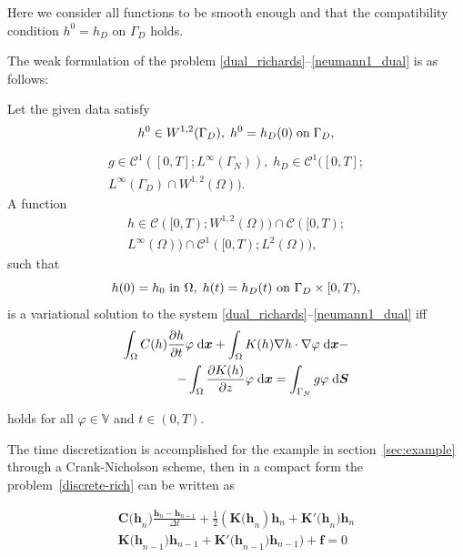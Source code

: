 \documentclass[final,3p,times,twocolumn]{elsarticle}
\newcommand{\bfx}{\mbox{\boldmath $x$}}
\newcommand{\bfS}{\mbox{\boldmath $S$}}
\begin{document}
Here we consider all functions to be smooth enough and that the
compatibility condition $h^0=h_D$ on $\Gamma_D$ holds.


The weak formulation of the problem
\eqref{dual_richards}--\eqref{neumann1_dual} is as follows:

Let the given data satisfy
\begin{equation}
h^0 \in W^{1,2}(\Gamma_D),  \; h^0 = h_D(0) \; \textmd{on}\;\Gamma_D,
\end{equation}
\begin{equation}
\begin{split}
g \in \mathcal{C}^1([0,T];L^{\infty}(\Gamma_N)),  \; h_D \in
\mathcal{C}^1([0,T];  \\ L^{\infty}(\Gamma_D)\cap W^{1,2}(\Omega)).
\end{split}
\end{equation}
A function
\begin{equation*}
\begin{split}
h \in \mathcal{C}([0,T);W^{1,2}(\Omega))\cap
\mathcal{C}([0,T); \\ L^{\infty}(\Omega))\cap
\mathcal{C}^1([0,T);L^{2}(\Omega)),
\end{split}
\end{equation*}
such that
$$
h(0)=h_0 \textmd{ in } \Omega, \; h(t)=h_D(t) \textmd{ on } \Gamma_D
\times [0,T),
$$
is a variational solution to the system
\eqref{dual_richards}--\eqref{neumann1_dual} iff
\begin{equation}
\begin{split}
\int_{\Omega}  C(h)\frac{\partial h}{\partial t}\varphi \;{\rm
d}\bfx + \int_{\Omega} K(h)\nabla h \cdot \nabla \varphi \;{\rm
d}\bfx - \\ - \int_{\Omega}\frac{\partial K(h)}{\partial z}\varphi \;{\rm
d}\bfx = \int_{\Gamma_N} g \varphi \;{\rm d}\bfS
\end{split}
\label{discrete-rich}
\end{equation}

holds for all $\varphi \in \mathbb{V}$ and $t\in(0,T)$.



The time discretization is accomplished for the example in section~\ref{sec:example} through a Crank-Nicholson scheme, then in  a compact form the  problem~\eqref{discrete-rich} can be written as

\begin{equation}
\begin{split}
\mathbf{C(h}_n^{}) \frac{\mathbf{h}_{n}-\mathbf{h}_{n-1}}{\Delta t} +  \frac{1}{2}(\mathbf{K(h}_n^{})\mathbf{h}_n + \mathbf{K'(h}_n^{})\mathbf{h}_n  \\ \mathbf{K(h}_{n-1}^{})\mathbf{h}_{n-1} + \mathbf{K'(h}_{n-1}^{})\mathbf{h}_{n-1}) +  \mathbf{f} = 0 
\end{split}
\end{equation}
\end{document}

